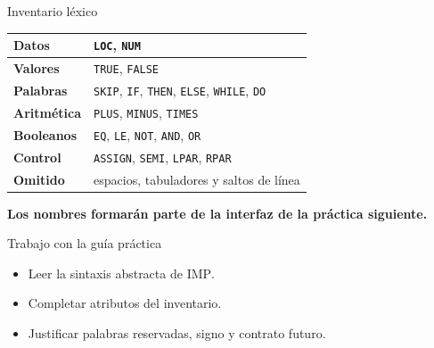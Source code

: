 \documentclass[11pt,spanish]{beamer}
\newcommand{\term}[1]{\textbf{\textcolor{indiagreen!80!black}{#1}}}
\newcommand{\actividad}[1]{\textbf{\textcolor{Rojo}{#1}}}
\begin{document}
\begin{frame}{Inventario léxico}
\vfill

\begin{center}
\scriptsize
\renewcommand{\arraystretch}{1.25}
\begin{tabular}{|L{.19\textwidth}|L{.68\textwidth}|}
\hline
\textbf{Datos} & \texttt{LOC}, \texttt{NUM} \\
\hline
\textbf{Valores} & \texttt{TRUE}, \texttt{FALSE} \\
\hline
\textbf{Palabras} & \texttt{SKIP}, \texttt{IF}, \texttt{THEN}, \texttt{ELSE}, \texttt{WHILE}, \texttt{DO} \\
\hline
\textbf{Aritmética} & \texttt{PLUS}, \texttt{MINUS}, \texttt{TIMES} \\
\hline
\textbf{Booleanos} & \texttt{EQ}, \texttt{LE}, \texttt{NOT}, \texttt{AND}, \texttt{OR} \\
\hline
\textbf{Control} & \texttt{ASSIGN}, \texttt{SEMI}, \texttt{LPAR}, \texttt{RPAR} \\
\hline
\textbf{Omitido} & espacios, tabuladores y saltos de línea \\
\hline
\end{tabular}
\end{center}

\bigskip

\term{Los nombres formarán parte de la interfaz de la práctica siguiente.}

\vfill
\end{frame}

\begin{frame}{Trabajo con la guía práctica}
\vfill
\begin{center}
\end{center}
\bigskip
\begin{itemize}
  \item Leer la sintaxis abstracta de \textsc{IMP}.
  \item Completar atributos del inventario.
  \item Justificar palabras reservadas, signo y contrato futuro.
\end{itemize}
\vfill
\end{frame}
\end{document}
